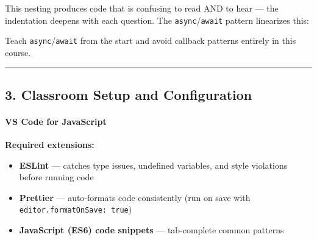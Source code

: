 \documentclass[
  justified,
  openright,
]{tufte-book}
\let\subsubsection\paragraph
\let\paragraph\paragraph
\newcommand{\BuiltInTok}[1]{#1}
\newcommand{\CommentTok}[1]{\textcolor{MidGray}{#1}}
\newcommand{\ControlFlowTok}[1]{\textcolor{BrandBlue}{#1}}
\newcommand{\FunctionTok}[1]{\textcolor{BrandBlue}{#1}}
\newcommand{\KeywordTok}[1]{\textcolor{BrandBlue}{#1}}
\newcommand{\NormalTok}[1]{#1}
\newcommand{\OperatorTok}[1]{\textcolor{DarkGray}{#1}}
\newcommand{\SpecialCharTok}[1]{\textcolor{Teal}{#1}}
\newcommand{\StringTok}[1]{\textcolor{Teal}{#1}}
\newcommand{\VerbatimStringTok}[1]{\textcolor{Teal}{#1}}
\newenvironment{Shaded}{%
  \begin{snugshade}
}{%
  \end{snugshade}
}
\let\subsubsection\paragraph
\let\paragraph\paragraph
\providecommand{\tightlist}{%
  \setlength{\itemsep}{0pt}\setlength{\parskip}{0pt}}
\begin{document}
This nesting produces code that is confusing to read AND to hear --- the
indentation deepens with each question. The
\texttt{async}/\texttt{await} pattern linearizes this:

\begin{Shaded}
\end{Shaded}

Teach \texttt{async}/\texttt{await} from the start and avoid callback
patterns entirely in this course.

\begin{center}\rule{0.5\linewidth}{0.5pt}\end{center}

\subsection{3. Classroom Setup and
Configuration}\label{classroom-setup-and-configuration}

\subsubsection{VS Code for JavaScript}\label{vs-code-for-javascript}

\textbf{Required extensions:}

\begin{itemize}
\tightlist
\item
  \textbf{ESLint} --- catches type issues, undefined variables, and
  style violations before running code
\item
  \textbf{Prettier} --- auto-formats code consistently (run on save with
  \texttt{editor.formatOnSave:\ true})
\item
  \textbf{JavaScript (ES6) code snippets} --- tab-complete common
  patterns
\end{itemize}
\end{document}
